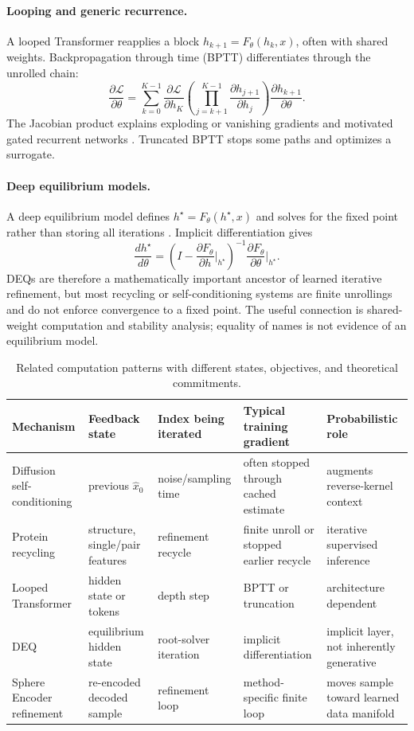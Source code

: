 \documentclass{article}
\begin{document}
\paragraph{Looping and generic recurrence.}
A looped Transformer reapplies a block \(h_{k+1}=F_\theta(h_k,x)\), often with shared weights. Backpropagation through time (BPTT) differentiates through the unrolled chain:
\[
\frac{\partial \mathcal{L}}{\partial\theta}
=\sum_{k=0}^{K-1}
\frac{\partial\mathcal{L}}{\partial h_K}
\left(\prod_{j=k+1}^{K-1}\frac{\partial h_{j+1}}{\partial h_j}\right)
\frac{\partial h_{k+1}}{\partial\theta}.
\]
The Jacobian product explains exploding or vanishing gradients and motivated gated recurrent networks \citep{hochreiter1997lstm}. Truncated BPTT stops some paths and optimizes a surrogate.

\paragraph{Deep equilibrium models.}
A deep equilibrium model defines \(h^\star=F_\theta(h^\star,x)\) and solves for the fixed point rather than storing all iterations \citep{bai2019deep}. Implicit differentiation gives
\[
\frac{dh^\star}{d\theta}
=
\left(I-\frac{\partial F_\theta}{\partial h}\bigg|_{h^\star}\right)^{-1}
\frac{\partial F_\theta}{\partial\theta}\bigg|_{h^\star}.
\]
DEQs are therefore a mathematically important ancestor of learned iterative refinement, but most recycling or self-conditioning systems are finite unrollings and do not enforce convergence to a fixed point. The useful connection is shared-weight computation and stability analysis; equality of names is not evidence of an equilibrium model.

\begin{table}[t]
\centering
\small
\begin{tabularx}{\textwidth}{@{}p{2.2cm}p{2.5cm}p{2.1cm}p{2.1cm}X@{}}
\toprule
Mechanism & Feedback state & Index being iterated & Typical training gradient & Probabilistic role \\
\midrule
Diffusion self-conditioning & previous \(\hat x_0\) & noise/sampling time & often stopped through cached estimate & augments reverse-kernel context \\
Protein recycling & structure, single/pair features & refinement recycle & finite unroll or stopped earlier recycle & iterative supervised inference \\
Looped Transformer & hidden state or tokens & depth step & BPTT or truncation & architecture dependent \\
DEQ & equilibrium hidden state & root-solver iteration & implicit differentiation & implicit layer, not inherently generative \\
Sphere Encoder refinement & re-encoded decoded sample & refinement loop & method-specific finite loop & moves sample toward learned data manifold \\
\bottomrule
\end{tabularx}
\caption{Related computation patterns with different states, objectives, and theoretical commitments.}
\label{tab:recurrence}
\end{table}
\end{document}
